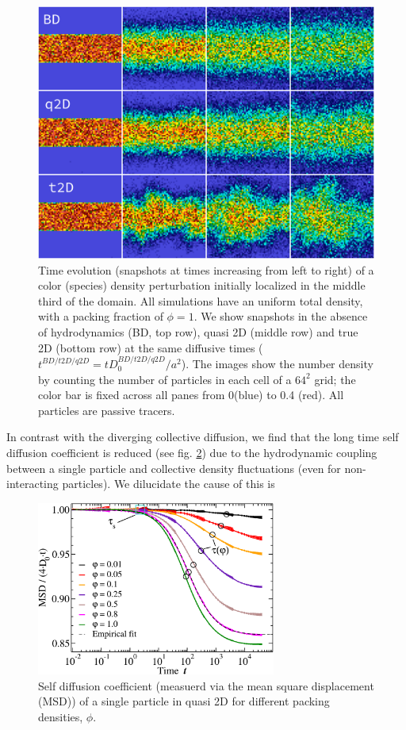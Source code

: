 \documentclass[ twoside,openright,titlepage,numbers=noenddot,%
headinclude,footinclude,cleardoublepage=empty,abstract=on,
BCOR=5mm,paper=a4,fontsize=11pt, dvipsnames
]{scrreprt}
\begin{document}
\begin{figure}[H]
  \label{fig:q2Dcolorstripe}
  \centering
  \includegraphics[width=\linewidth]{gfx/q2Dcolorstripe}
  \caption{Time evolution (snapshots at times increasing from left to right) of a color (species) density perturbation initially localized in the middle third of the domain. All simulations have an uniform total density, with a packing fraction of $\phi = 1$. We show snapshots in the absence of hydrodynamics (BD, top row), quasi 2D (middle row) and true 2D (bottom row) at the same diffusive times ($t^{BD/t2D/q2D}= tD_0^{BD/t2D/q2D}/a^2$). The images show the number density by counting the number of particles in each cell of a $64^2$ grid; the color bar is fixed across all panes from 0(blue) to 0.4 (red). All particles are passive tracers.}
\end{figure}

In contrast with the diverging collective diffusion, we find that the long time self diffusion coefficient is reduced (see fig. \ref{fig:q2Dselfreduction}) due to the hydrodynamic coupling between a single particle and collective density fluctuations (even for non-interacting particles). We dilucidate the cause of this is 
\begin{figure}[H]
  \label{fig:q2Dselfreduction}
  \centering
  \includegraphics[width=0.7\textwidth]{gfx/q2Dselfreduction}
  \caption{Self diffusion coefficient (measuerd via the mean square displacement (MSD)) of a single particle in quasi 2D for different packing densities, $\phi$.}
\end{figure}
\end{document}
